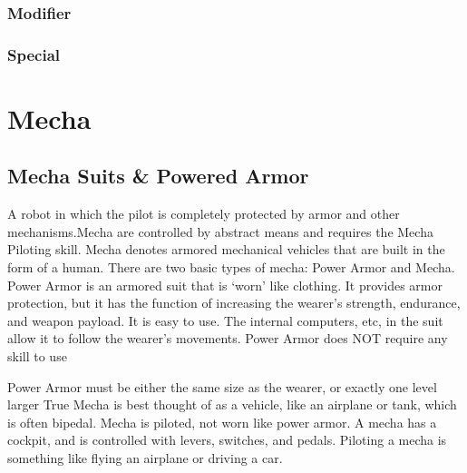 \documentclass[twoside]{book}
\begin{document}
\subsection{Modifier}
    
\subsection{Special}
    
\chapter{Mecha}
    
\section{Mecha Suits \& Powered Armor}
      A robot in which the pilot is completely protected by
             armor and other mechanisms.Mecha are controlled by abstract
             means and requires the Mecha Piloting skill.   Mecha denotes armored mechanical vehicles that are
             built in the form of a human. There are two basic types of
             mecha: Power Armor and Mecha.   Power Armor is an armored suit that is
             `worn' like clothing. It provides armor
             protection, but it has the function of increasing the
             wearer's strength, endurance, and weapon payload. It
             is easy to use. The internal computers, etc, in the suit
             allow it to follow the wearer's movements.   
               Power Armor does NOT require any skill to use
               
               Power Armor must be either the same size as the
               wearer, or exactly one level larger 
            True Mecha is best thought of as a vehicle, like an
             airplane or tank, which is often bipedal. Mecha is piloted,
             not worn like power armor. A mecha has a cockpit, and is
             controlled with levers, switches, and pedals. Piloting a
             mecha is something like flying an airplane or driving a car.
               
\end{document}
